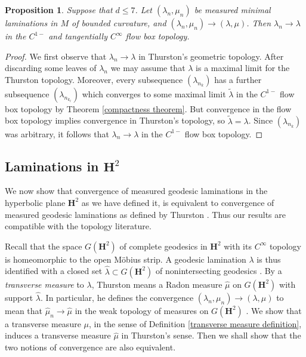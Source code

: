 \documentclass[reqno,11pt]{amsart}
\newcommand{\Hyp}{\mathbf H}
\newcommand{\dfn}[1]{\emph{#1}\index{#1}}
\newtheorem{proposition}[theorem]{Proposition}
\theoremstyle{definition}
\numberwithin{equation}{section}
\begin{document}
\begin{proposition}\label{convergence of traansverse measures means flow box convergence}
Suppose that $d \leq 7$.
Let $(\lambda_n, \mu_n)$ be measured minimal laminations in $M$ of bounded curvature, and $(\lambda_n, \mu_n) \to (\lambda, \mu)$.
Then $\lambda_n \to \lambda$ in the $C^{1-}$ and tangentially $C^\infty$ flow box topology.
\end{proposition}
\begin{proof}
We first observe that $\lambda_n \to \lambda$ in Thurston's geometric topology.
After discarding some leaves of $\lambda_n$ we may assume that $\lambda$ is a maximal limit for the Thurston topology.
Moreover, every subsequence $(\lambda_{n_k})$ has a further subsequence $(\lambda_{n_{k_\ell}})$ which converges to some maximal limit $\tilde \lambda$ in the $C^{1-}$ flow box topology by Theorem \ref{compactness theorem}.
But convergence in the flow box topology implies convergence in Thurston's topology, so $\tilde \lambda = \lambda$.
Since $(\lambda_{n_k})$ was arbitrary, it follows that $\lambda_n \to \lambda$ in the $C^{1-}$ flow box topology.
\end{proof}

\subsection{Laminations in \texorpdfstring{$\Hyp^2$}{the hyperbolic plane}}\label{hyperbolic equivalence}
We now show that convergence of measured geodesic laminations in the hyperbolic plane $\Hyp^2$ as we have defined it, is equivalent to convergence of measured geodesic laminations as defined by Thurston \cite[Chapter 8]{thurston1979geometry}.
Thus our results are compatible with the topology literature.

Recall that the space $G(\Hyp^2)$ of complete geodesics in $\Hyp^2$ with its $C^\infty$ topology is homeomorphic to the open M\"obius strip.
A geodesic lamination $\lambda$ is thus identified with a closed set $\hat \lambda \subset G(\Hyp^2)$ of nonintersecting geodesics \cite[\S8.5]{thurston1979geometry}.
By a \dfn{transverse measure} to $\lambda$, Thurston means a Radon measure $\hat \mu$ on $G(\Hyp^2)$ with support $\hat \lambda$.
In particular, he defines the convergence $(\lambda_n, \mu_n) \to (\lambda, \mu)$ to mean that $\hat \mu_n \to \hat \mu$ in the weak topology of measures on $G(\Hyp^2)$ \cite[\S8.10]{thurston1979geometry}.
We show that a transverse measure $\mu$, in the sense of Definition \ref{transverse measure definition}, induces a transverse measure $\hat \mu$ in Thurston's sense.
Then we shall show that the two notions of convergence are also equivalent.
\end{document}
